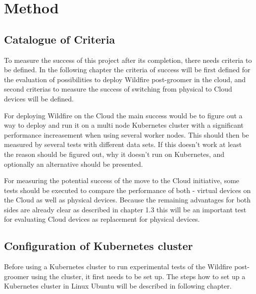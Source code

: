 
\chapter{Method}

\section{Catalogue of Criteria}

To measure the success of this project after its completion, there needs criteria to be defined. In the following chapter the criteria of success will be first defined for the evaluation of possibilities to deploy Wildfire post-groomer in the cloud, and second criterias to measure the success of switching from physical to Cloud devices will be defined.

For deploying Wildfire on the Cloud the main success would be to figure out a way to deploy and run it on a multi node Kubernetes cluster with a significant performance increasement when using several worker nodes. This should then be measured by several tests with different data sets. If this doesn't work at least the reason should be figured out, why it doesn't run on Kubernetes, and optionally an alternative should be presented.

For measuring the potential success of the move to the Cloud initiative, some tests should be executed to compare the performance of both - virtual devices on the Cloud as well as physical devices. Because the remaining advantages for both sides are already clear as described in chapter 1.3 this will be an important test for evaluating Cloud devices as replacement for physical devices.

\section{Configuration of Kubernetes cluster}

Before using a Kubernetes cluster to run experimental tests of the Wildfire post-groomer using the cluster, it first needs to be set up. The steps how to set up a Kubernetes cluster in Linux Ubuntu will be described in following chapter.

